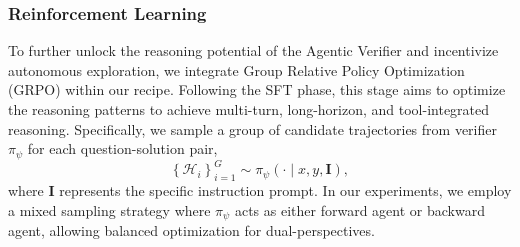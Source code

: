 \documentclass[11pt]{article}
\begin{document}
\subsubsection{Reinforcement Learning}
To further unlock the reasoning potential of the Agentic Verifier and incentivize autonomous exploration, we integrate Group Relative Policy Optimization (GRPO) within our recipe. Following the SFT phase, this stage aims to optimize the reasoning patterns to achieve multi-turn, long-horizon, and tool-integrated reasoning.
Specifically, we sample a group of candidate trajectories from verifier $\pi_{\psi}$ for each question-solution pair,
\begin{equation}
\left\{\mathcal{H}_i\right\}_{i=1}^G \sim \pi_{\psi}(\cdot \mid x, y, \mathbf{I}),
\end{equation}
where $\mathbf{I}$ represents the specific instruction prompt. In our experiments, we employ a mixed sampling strategy where $\pi_{\psi}$ acts as either forward agent or backward agent, allowing balanced optimization for dual-perspectives.
\end{document}
